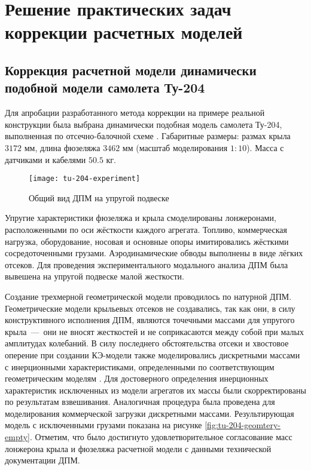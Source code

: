 \chapter{Решение практических задач коррекции расчетных моделей} 

\section{Коррекция расчетной модели динамически подобной модели самолета Ту-204}

Для апробации разработанного метода коррекции на примере реальной конструкции была выбрана динамически подобная модель самолета Ту-204, выполненная по отсечно-балочной схеме . Габаритные размеры: размах крыла $ 3172 $ мм, длина фюзеляжа $ 3462 $ мм (масштаб моделирования $ 1:10 $). Масса с датчиками и кабелями $ 50.5 $ кг.

\begin{figure}[!htb]
	\centerfloat
	\texttt{[image: tu-204-experiment]}
	\caption{Общий вид ДПМ на упругой подвеске} \label{fig:tu-204-experiment}	
\end{figure}

Упругие характеристики фюзеляжа и крыла смоделированы лонжеронами, расположенными по оси жёсткости каждого агрегата. Топливо, коммерческая нагрузка, оборудование, носовая и основные опоры имитировались жёсткими сосредоточенными грузами. Аэродинамические обводы выполнены в виде лёгких отсеков. Для проведения экспериментального модального анализа ДПМ была вывешена на упругой подвеске малой жесткости.

Создание трехмерной геометрической модели  проводилось по натурной ДПМ. Геометрические модели крыльевых отсеков не создавались, так как они, в силу конструктивного исполнения ДПМ, являются точечными массами для упругого крыла~---~они не вносят жесткостей и не соприкасаются между собой при малых амплитудах колебаний. В силу последнего обстоятельства отсеки и хвостовое оперение при создании КЭ-модели также моделировались дискретными массами с инерционными характеристиками, определенными по соответствующим геометрическим моделям . Для достоверного определения инерционных характеристик исключенных из модели агрегатов их массы были скорректированы по результатам взвешивания. Аналогичная процедура была проведена для моделирования коммерческой загрузки дискретными массами. Результирующая модель с исключенными грузами показана на рисунке \ref{fig:tu-204-geomtery-empty}. Отметим, что было достигнуто удовлетворительное согласование масс лонжерона крыла и фюзеляжа расчетной модели с данными технической документации ДПМ.

